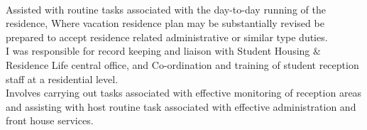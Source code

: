 \documentclass[]{deedy-resume-openfont}
\begin{document}
\begin{minipage}[t]{0.66\textwidth}
\\
Assisted with routine tasks associated with the day-to-day running of the residence, Where vacation residence plan may be substantially revised be prepared to accept residence related administrative or similar type duties.
\sectionsep
\\
I was responsible for record keeping and liaison with Student Housing $\&$ Residence Life central office, and Co-ordination and training of student reception staff at a residential level.
\sectionsep
\\
Involves carrying out tasks associated with effective monitoring of reception areas and assisting with host routine task associated with effective administration and front house services.
\sectionsep

\end{minipage} 

\newpage
\end{document}
